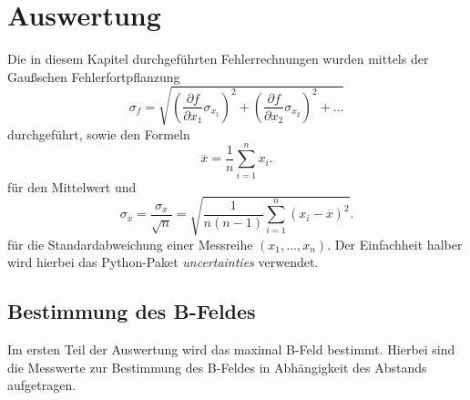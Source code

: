 \section{Auswertung}
\label{sec:Auswertung}

Die in diesem Kapitel durchgeführten Fehlerrechnungen wurden mittels der Gaußschen Fehlerfortpflanzung 
\begin{equation}
    \sigma_f = \sqrt{\left( \frac{\partial f}{\partial x_1} \sigma_{x_1} \right)^2 + \left( \frac{\partial f}{\partial x_2} \sigma_{x_2} \right)^2 + ...}
\end{equation}
durchgeführt, sowie den Formeln 
\begin{equation}
    \overline{x} = \frac{1}{n} \sum^n_{i=1}x_i . 
    \label{eq:mittelwert}
\end{equation}
für den Mittelwert und 
\begin{equation}
    \sigma_{\overline{x}} = \frac{\sigma_x}{\sqrt{n}} = \sqrt{\frac{1}{n(n-1)}  \sum^n_{i=1} \left( x_i - \overline{x}\right)^2 } .
    \label{eq:abweichung}
\end{equation}
für die Standardabweichung einer Messreihe $\left( x_1, ... , x_n  \right)$.
Der Einfachheit halber wird hierbei das Python-Paket \textit{uncertainties} verwendet. \cite{uncertainties} \\
\hspace{1cm}

\subsection{Bestimmung des B-Feldes}
Im ersten Teil der Auswertung wird das maximal B-Feld bestimmt. Hierbei sind die Messwerte zur Bestimmung des B-Feldes in Abhängigkeit des Abstands aufgetragen.

